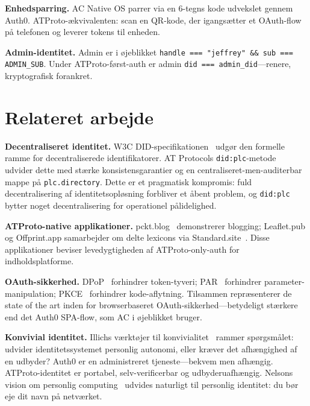 \documentclass[10pt,letterpaper,twocolumn]{article}
\begin{document}
\textbf{Enhedsparring.} AC Native OS parrer via en 6-tegns kode udvekslet gennem Auth0. ATProto-ækvivalenten: scan en QR-kode, der igangsætter et OAuth-flow på telefonen og leverer tokens til enheden.

\textbf{Admin-identitet.} Admin er i øjeblikket \texttt{handle === "jeffrey" \&\& sub === ADMIN\_SUB}. Under ATProto-først-auth er admin \texttt{did === admin\_did}---renere, kryptografisk forankret.


\section{Relateret arbejde}
\label{sec:related}

\textbf{Decentraliseret identitet.} W3C DID-specifikationen~\citep{w3cdid2022} udgør den formelle ramme for decentraliserede identifikatorer. AT Protocols \texttt{did:plc}-metode~\citep{atproto2024did} udvider dette med stærke konsistensgarantier og en centraliseret-men-auditerbar mappe på \texttt{plc.directory}. Dette er et pragmatisk kompromis: fuld decentralisering af identitetsopløsning forbliver et åbent problem, og \texttt{did:plc} bytter noget decentralisering for operationel pålidelighed.

\textbf{ATProto-native applikationer.} pckt.blog~\citep{pcktblog2025} demonstrerer blogging; Leaflet.pub og Offprint.app samarbejder om delte lexicons via Standard.site~\citep{standardsite2025}. Disse applikationer beviser levedygtigheden af ATProto-only-auth for indholdsplatforme.

\textbf{OAuth-sikkerhed.} DPoP~\citep{rfc9449dpop} forhindrer token-tyveri; PAR~\citep{rfc9126par} forhindrer parameter-manipulation; PKCE~\citep{rfc7636pkce} forhindrer kode-aflytning. Tilsammen repræsenterer de state of the art inden for browserbaseret OAuth-sikkerhed---betydeligt stærkere end det Auth0 SPA-flow, som AC i øjeblikket bruger.

\textbf{Konvivial identitet.} Illichs værktøjer til konvivialitet~\citep{illich1973tools} rammer spørgsmålet: udvider identitetssystemet personlig autonomi, eller kræver det afhængighed af en udbyder? Auth0 er en administreret tjeneste---bekvem men afhængig. ATProto-identitet er portabel, selv-verificerbar og udbyderuafhængig. Nelsons vision om personlig computing~\citep{nelson1974computerlib} udvides naturligt til personlig identitet: du bør eje dit navn på netværket.

\end{document}
